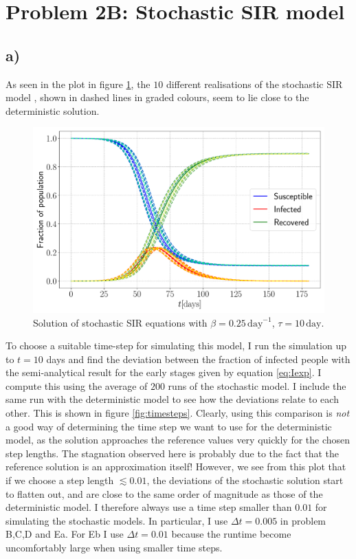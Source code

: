 \section{Problem 2B: Stochastic SIR model}

\subsection{a)}

As seen in the plot in figure \ref{fig:SIR_stoch}, the $10$ different realisations of the stochastic SIR model , shown in dashed lines in graded colours, seem to lie close to the deterministic solution.

\begin{figure}[htb]
	\centering
	\includegraphics[width=0.8\columnwidth]{../fig/2Ba_SIR.pdf}
	\caption{Solution of stochastic SIR equations with $\beta = 0.25\, \mathrm{day}^{-1}$, $\tau = 10\, \mathrm{day}$.}
	\label{fig:SIR_stoch}
\end{figure}

To choose a suitable time-step for simulating this model, I run the simulation up to $t = 10$ days and find the deviation between the fraction of infected people with the semi-analytical result for the early stages given by equation \ref{eq:Iexp}. I compute this using the average of $200$ runs of the stochastic model. I include the same run with the deterministic model to see how the deviations relate to each other. This is shown in figure \ref{fig:timesteps}. Clearly, using this comparison is \textit{not} a good way of determining the time step we want to use for the deterministic model, as the solution approaches the reference values very quickly for the chosen step lengths. The stagnation observed here is probably due to the fact that the reference solution is an approximation itself! However, we see from this plot that if we choose a step length $\lesssim 0.01$, the deviations of the stochastic solution start to flatten out, and are close to the same order of magnitude as those of the deterministic model. I therefore always use a time step smaller than $0.01$ for simulating the stochastic models. In particular, I use $\Delta t = 0.005$ in problem B,C,D and Ea. For Eb I use $\Delta t = 0.01$ because the runtime become uncomfortably large when using smaller time steps.

